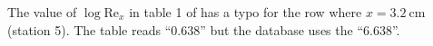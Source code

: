 The value of $\log \mathrm{Re}_x$ in table 1 of
\citet{SchultzGrunowF+1940+deu+JOUR} has a typo for the row where $x =
\SI{3.2}{\cm}$ (station 5).  The table reads ``0.638'' but the database uses
the ``6.638''.
